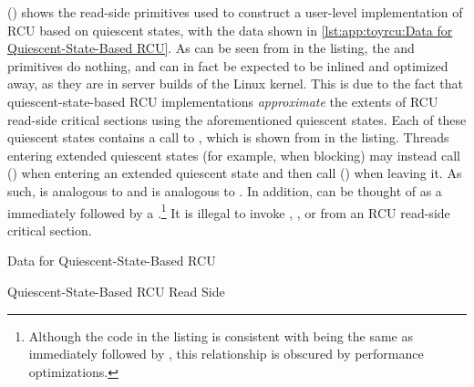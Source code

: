 \begin{fcvref}
()
shows the read-side primitives used to construct a user-level
implementation of RCU based on quiescent states, with the data shown in
\cref{lst:app:toyrcu:Data for Quiescent-State-Based RCU}.
As can be seen from  in the listing,
the 
and  primitives do nothing, and can in fact
be expected to be inlined and optimized away, as they are in
server builds of the Linux kernel.
This is due to the fact that quiescent-state-based RCU implementations
\emph{approximate} the extents of RCU read-side critical sections
using the aforementioned quiescent states.
Each of these quiescent states contains a call to
, which is shown from
 in the listing.
Threads entering extended quiescent states (for example, when blocking)
may instead call 
() when entering
an extended quiescent state and then call
() when leaving it.
As such,  is analogous to 
and  is analogous to .
In addition,  can be thought of as a
 immediately followed by a
.\footnote{
	Although the code in the listing is consistent with
	being the same as  immediately followed by
	, this relationship is obscured by
	performance optimizations.}
It is illegal to invoke , ,
or  from an RCU read-side critical section.
\end{fcvref}

\begin{listing}[tbp]

\caption{Data for Quiescent-State-Based RCU}
\label{lst:app:toyrcu:Data for Quiescent-State-Based RCU}
\end{listing}

\begin{listing}[tbp]

\caption{Quiescent-State-Based RCU Read Side}
\label{lst:app:toyrcu:Quiescent-State-Based RCU Read Side}
\end{listing}

